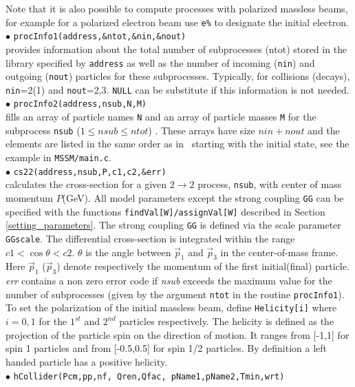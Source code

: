 \documentclass[12pt,a4paper]{article}
\begin{document}
Note that it is also possible to compute processes with polarized massless beams, 
for example for a polarized electron beam use \verb|e%|
 to designate the initial electron.\\[2mm]
%
\noindent
$\bullet$ \verb|procInfo1(address,&ntot,&nin,&nout)|\\
provides information  about the total number of subprocesses
(ntot) stored in the library  specified by {\tt address} as well
as the number of incoming (\verb|nin|) and outgoing (\verb|nout|) particles for
these subprocesses. Typically, for collisions (decays), \verb|nin|=2(1) and \verb|nout|=2,3.
\verb|NULL| can be substitute if this information is not needed. \\[2mm]
%
$\bullet$ \verb|procInfo2(address,nsub,N,M)|\\
fills an array of
particle names \verb|N| and an array of particle  masses \verb|M| for the subprocess \verb|nsub| ($1\leq nsub \leq ntot$) . These
arrays have size $nin+nout$ and the elements are listed in the same order
as in \calchep\ starting with the initial state, see the example in 
\verb|MSSM/main.c|.\\[2mm]
%
\noindent
$\bullet$ \verb|cs22(address,nsub,P,c1,c2,&err)|\\
calculates  the cross-section for a given $2\rightarrow 2$
process, \verb|nsub|, with  center of mass momentum $P$(GeV). 
All model parameters  except the strong coupling {\tt GG}
can be specified with the functions {\tt findVal[W]/assignVal[W]}
described in Section \ref{setting_parameters}. The strong coupling {\tt GG}
is defined via the scale parameter {\tt GGscale}.    
The
differential cross-section is integrated
 within the range  $ c1 < \cos\theta <c2 $. $\theta$ is
the angle between $\vec{p}_1$ and $\vec{p}_3$  in the
center-of-mass frame. Here $\vec{p}_1$ ($\vec{p}_3$) denote
respectively the momentum of the first initial(final) particle.
{\it err} contains a non zero error code if {\it nsub} exceeds the
maximum value  for the number of subprocesses (given by the
argument \verb|ntot| in the routine {\tt procInfo1}). To set the polarization 
of the initial massless beam, define   \verb|Helicity[i]|  where $i=0,1$ 
for the $1^{st}$ and $2^{nd}$ particles respectively.
The   helicity is defined as the projection of the particle spin
on the direction of motion. It ranges from  [-1,1] for spin 1 particles and 
from [-0.5,0.5]  for spin 1/2 particles.
By definition a left handed particle has a positive
helicity. \\[2mm]
%
\noindent$\bullet$ \verb|hCollider(Pcm,pp,nf, Qren,Qfac, pName1,pName2,Tmin,wrt)| 
\end{document}
